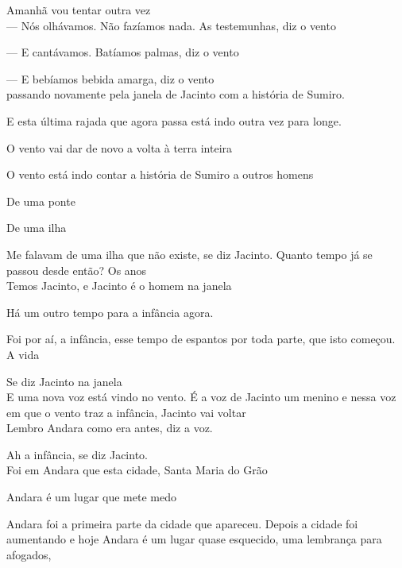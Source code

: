 Amanhã vou tentar outra vez\\

--- Nós olhávamos. Não fazíamos nada. As testemunhas, diz o vento

--- E cantávamos. Batíamos palmas, diz o vento

--- E bebíamos bebida amarga, diz o vento\\

passando novamente pela janela de Jacinto com a história de Sumiro.

E esta última rajada que agora passa está indo outra vez para longe.

O vento vai dar de novo a volta à terra inteira

O vento está indo contar a história de Sumiro a outros homens

\breakk

\clearpage
\thispagestyle{empty}

\movetooddpage

\vspace*{4cm}

De uma ponte

De uma ilha

Me falavam de uma ilha que não existe, se diz Jacinto. Quanto tempo já
se passou desde então? Os anos\\

Temos Jacinto, e Jacinto é o homem na janela

\breakk

\vspace*{4cm}

Há um outro tempo para a infância agora.

Foi por aí, a infância, esse tempo de espantos por toda parte, que isto
começou. A vida

Se diz Jacinto na janela\\

E uma nova voz está vindo no vento. É a voz de Jacinto um menino e nessa
voz em que o vento traz a infância, Jacinto vai voltar\\

Lembro Andara como era antes, diz a voz.

Ah a infância, se diz Jacinto.\\

Foi em Andara que esta cidade, Santa Maria do Grão

Andara é um lugar que mete medo

Andara foi a primeira parte da cidade que apareceu. Depois a cidade foi
aumentando e hoje Andara é um lugar quase esquecido, uma lembrança para
afogados,


